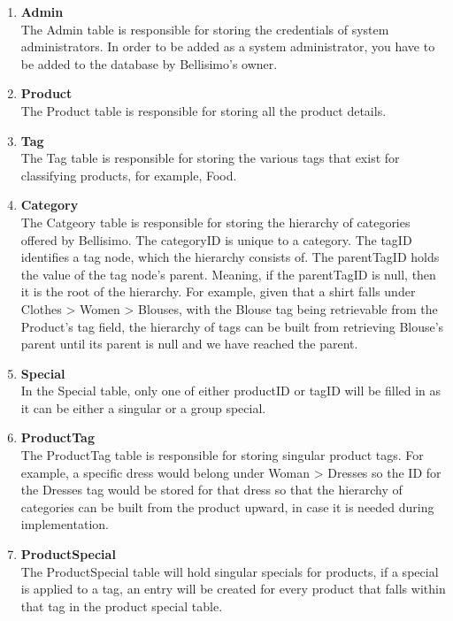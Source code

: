 \documentclass[a4paper,10pt]{article}
\begin{document}
\begin{enumerate}
	\item \textbf{Admin}\\
	The Admin table is responsible for storing the credentials of system administrators. In order to be added as a system administrator, you have to be added to the database by Bellisimo's owner.
	\item \textbf{Product}\\
	The Product table is responsible for storing all the product details.
	\item \textbf{Tag}\\
	The Tag table is responsible for storing the various tags that exist for classifying products, for example, Food.
	\item \textbf{Category}\\
	The Catgeory table is responsible for storing the hierarchy of categories offered by Bellisimo. The categoryID is unique to a category. The tagID identifies a tag node, which the hierarchy consists of. The parentTagID holds the value of the tag node's parent. Meaning, if the parentTagID is null, then it is the root of the hierarchy. For example, given that a shirt falls under Clothes > Women > Blouses, with the Blouse tag being retrievable from the Product's tag field, the hierarchy of tags can be built from retrieving Blouse's parent until its parent is null and we have reached the parent.
	\item \textbf{Special}\\
	In the Special table, only one of either productID or tagID will be filled in as it can be either a singular or a group special.
	\item \textbf{ProductTag}\\
	The ProductTag table is responsible for storing singular product tags. For example, a specific dress would belong under Woman > Dresses so the ID for the Dresses tag would be stored for that dress so that the hierarchy of categories can be built from the product upward, in case it is needed during implementation.
	\item \textbf{ProductSpecial}\\
	The ProductSpecial table will hold singular specials for products, if a special is applied to a tag, an entry will be created for every product that falls within that tag in the product special table.
\end{enumerate}


\newpage
\clearpage
\end{document}
